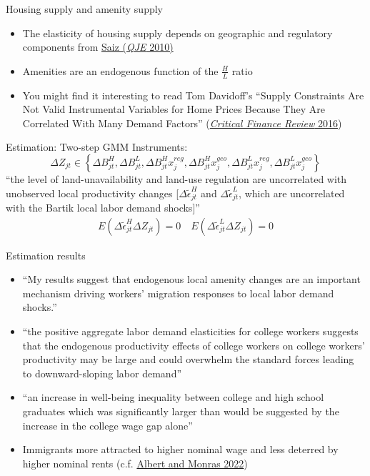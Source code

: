 \documentclass[11pt,notes=hide,aspectratio=169]{beamer}
\begin{document}
\begin{frame}{Housing supply and amenity supply}
\begin{itemize}
	\item The elasticity of housing supply depends on geographic and regulatory components from \href{https://doi.org/10.1162/qjec.2010.125.3.1253}{Saiz (\textit{QJE} 2010)}
	\item Amenities are an endogenous function of the $\frac{H}{L}$ ratio
	\item You might find it interesting to read Tom Davidoff's ``Supply Constraints Are Not Valid Instrumental Variables for Home Prices Because They Are Correlated With Many Demand Factors'' (\href{https://www.nowpublishers.com/article/Details/CFR-0037}{\textit{Critical Finance Review} 2016})
\end{itemize}
\end{frame}
\begin{frame}[plain]{Estimation: Two-step GMM}
{\footnotesize
Instruments:
\begin{equation*}
\Delta Z_{jt} \in \left\{
\Delta B^{H}_{jt}, 
\Delta B^{L}_{jt}, 
\Delta B^{H}_{jt} x^{reg}_{j}, 
\Delta B^{H}_{jt} x^{geo}_{j}, 
\Delta B^{L}_{jt} x^{reg}_{j}, 
\Delta B^{L}_{jt} x^{geo}_{j}
\right\}
\end{equation*}
``the level of land-unavailability and land-use regulation are uncorrelated with unobserved local productivity changes [$\Delta \tilde{\epsilon}_{jt}^{H}$ and $\Delta \tilde{\epsilon}_{jt}^{L}$, which are uncorrelated with the Bartik local labor demand shocks]''
\begin{align*}
E \left(\Delta \tilde{\epsilon}_{jt}^{H} \Delta Z_{jt}\right) = 0 
\quad
E \left(\Delta \tilde{\epsilon}_{jt}^{L} \Delta Z_{jt}\right) = 0 
\end{align*}
}
\end{frame}
\begin{frame}{Estimation results}
\begin{itemize}
	\item ``My results suggest that endogenous local amenity changes are an important mechanism driving workers' migration responses to local labor demand shocks.''
	\item ``the positive aggregate labor demand elasticities for college workers suggests that the endogenous productivity effects of college workers on college workers' productivity may be large and could overwhelm the standard forces leading to downward-sloping labor demand''
	\item ``an increase in well-being inequality between college and high school graduates which was significantly larger than would be suggested by the increase in the college wage gap alone''
	\item Immigrants more attracted to higher nominal wage and less deterred by higher nominal rents (c.f. \href{https://www.aeaweb.org/articles?id=10.1257/aer.20211241}{Albert and Monras 2022})
\end{itemize}
\end{frame}
\end{document}
